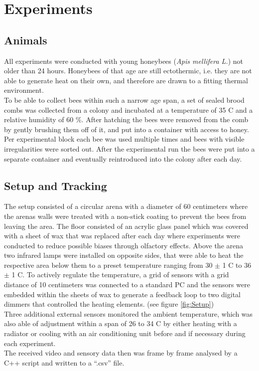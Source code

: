 \chapter{Experiments} \label{chap:experiments}
\label{Cha:Experiments}

\section{Animals}

All experiments were conducted with young honeybees (\textit{Apis mellifera L.}) not older than 24 hours. Honeybees of that age are still ectothermic, i.e. they are not able to generate heat on their own, and therefore are drawn to a fitting thermal environment. \cite{heran1952}
\\
To be able to collect bees within such a narrow age span, a set of sealed brood combs was collected from a colony and incubated at a temperature of 35 \textdegree C and a relative humidity of 60 \%. After hatching the bees were removed from the comb by gently brushing them off of it, and put into a container with access to honey.
Per experimental block each bee was used multiple times and bees with visible irregularities were sorted out.
After the experimental run the bees were put into a separate container and eventually reintroduced into the colony after each day.

\section{Setup and Tracking}

The setup consisted of a circular arena with a diameter of 60 centimeters where the arenas walls were treated with a non-stick coating to prevent the bees from leaving the area. The floor consisted of an acrylic glass panel which was covered with a sheet of wax that was replaced after each day where experiments were conducted to reduce possible biases through olfactory effects. Above the arena two infrared lamps were installed on opposite sides, that were able to heat the respective area below them to a preset temperature ranging from 30 $\pm$ 1 \textdegree C  to 36 $\pm$ 1 \textdegree C. To actively regulate the temperature, a grid of sensors with a grid distance of 10 centimeters was connected to a standard PC and the sensors were embedded within the sheets of wax to generate a feedback loop to two digital dimmers that controlled the heating elements. (see figure \ref{fig:Setup})
\\
Three additional external sensors monitored the ambient temperature, which was also able of adjustment within a span of 26 to 34 \textdegree C by either heating with a radiator or cooling with an air conditioning unit before and if necessary during each experiment.
\\
The received video and sensory data then was frame by frame analysed by a C++ script and written to a ``.csv'' file. 


